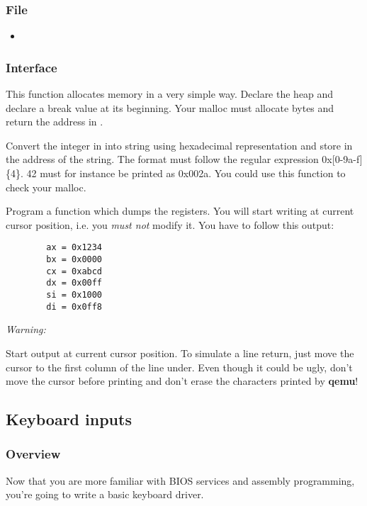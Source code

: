 \subsubsection*{File}
\begin{itemize}
  \item {}
\end{itemize}

\subsubsection*{Interface}
{
  This function allocates memory in a very simple way. Declare the heap and
  declare a break value at its beginning.
  Your malloc must allocate  bytes and return the address
  in .
}

{
  Convert the integer in  into string using hexadecimal
  representation and store in  the address of the string.
  The format must follow the regular expression 0x[0-9a-f]\{4\}.
  42 must for instance be printed as 0x002a. You could use this function
  to check your malloc.
}

{
  Program a function which dumps the registers. You will start writing
  at current cursor position, i.e. you \emph{must not} modify it. You have to
  follow this output:
}
\begin{verbatim}
        ax = 0x1234
        bx = 0x0000
        cx = 0xabcd
        dx = 0x00ff
        si = 0x1000
        di = 0x0ff8
\end{verbatim}

\command{}
{
  {\em Warning:}

  Start output at current cursor position. To simulate a line return, just move
  the cursor to the first column of the line under. Even though it could be
  ugly, don't move the cursor before printing and don't erase the characters
  printed by \textbf{qemu}!
}

%
%

\newpage

\subsection{Keyboard inputs}

\subsubsection*{Overview}
Now that you are more familiar with BIOS services and assembly programming,
you're going to write a basic keyboard driver.

